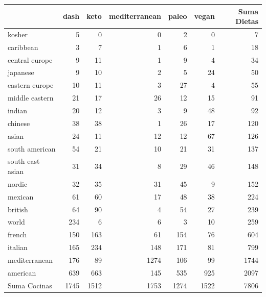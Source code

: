 \documentclass[12pt,a4paper]{article}
\begin{document}
{{            \begin{center}
                \begin{tabular}{l|rrrrr|r}
                \toprule
                    & dash & keto & mediterranean & paleo & vegan & Suma Dietas \\
                \midrule
                    kosher           & 5    & 0    & 0    & 2    & 0    & 7    \\
                    caribbean        & 3    & 7    & 1    & 6    & 1    & 18   \\
                    central europe   & 9    & 11   & 1    & 9    & 4    & 34   \\
                    japanese         & 9    & 10   & 2    & 5    & 24   & 50   \\
                    eastern europe   & 10   & 11   & 3    & 27   & 4    & 55   \\
                    middle eastern   & 21   & 17   & 26   & 12   & 15   & 91   \\
                    indian           & 20   & 12   & 3    & 9    & 48   & 92   \\
                    chinese          & 38   & 38   & 1    & 26   & 17   & 120  \\
                    asian            & 24   & 11   & 12   & 12   & 67   & 126  \\
                    south american   & 54   & 21   & 10   & 21   & 31   & 137  \\
                    south east asian & 31   & 34   & 8    & 29   & 46   & 148  \\
                    nordic           & 32   & 35   & 31   & 45   & 9    & 152  \\
                    mexican          & 61   & 60   & 17   & 48   & 38   & 224  \\
                    british          & 64   & 90   & 4    & 54   & 27   & 239  \\
                    world            & 234  & 6    & 6    & 3    & 10   & 259  \\
                    french           & 150  & 163  & 61   & 154  & 76   & 604  \\
                    italian          & 165  & 234  & 148  & 171  & 81   & 799  \\
                    mediterranean    & 176  & 89   & 1274 & 106  & 99   & 1744 \\
                    american         & 639  & 663  & 145  & 535  & 925  & 2097 \\
                \midrule
                    Suma Cocinas     & 1745 & 1512 & 1753 & 1274 & 1522 & 7806 \\
                \bottomrule
                \end{tabular}
            \end{center}

}}
\end{document}
